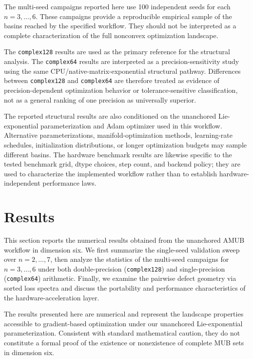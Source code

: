\documentclass[a4paper,twocolumn,11pt,amsfonts,amssymb]{quantumarticle}
\begin{document}
The multi-seed campaigns reported here use 100 independent seeds for each \(n=3,\ldots,6\). These campaigns provide a reproducible empirical sample of the basins reached by the specified workflow. They should not be interpreted as a complete characterization of the full nonconvex optimization landscape.

The \texttt{complex128} results are used as the primary reference for the structural analysis. The \texttt{complex64} results are interpreted as a precision-sensitivity study using the same CPU/native-matrix-exponential structural pathway. Differences between \texttt{complex128} and \texttt{complex64} are therefore treated as evidence of precision-dependent optimization behavior or tolerance-sensitive classification, not as a general ranking of one precision as universally superior.

The reported structural results are also conditioned on the unanchored Lie-exponential parameterization and Adam optimizer used in this workflow. Alternative parameterizations, manifold-optimization methods, learning-rate schedules, initialization distributions, or longer optimization budgets may sample different basins. The hardware benchmark results are likewise specific to the tested benchmark grid, dtype choices, step count, and backend policy; they are used to characterize the implemented workflow rather than to establish hardware-independent performance laws.

\section{Results}
\label{sec:results}

This section reports the numerical results obtained from the unanchored AMUB workflow in dimension six. We first summarize the single-seed validation sweep over $n=2,\ldots,7$, then analyze the statistics of the multi-seed campaigns for $n=3,\ldots,6$ under both double-precision (\texttt{complex128}) and single-precision (\texttt{complex64}) arithmetic. Finally, we examine the pairwise defect geometry via sorted loss spectra and discuss the portability and performance characteristics of the hardware-acceleration layer.

The results presented here are numerical and represent the landscape properties accessible to gradient-based optimization under our unanchored Lie-exponential parameterization. Consistent with standard mathematical caution, they do not constitute a formal proof of the existence or nonexistence of complete MUB sets in dimension six.
\end{document}
